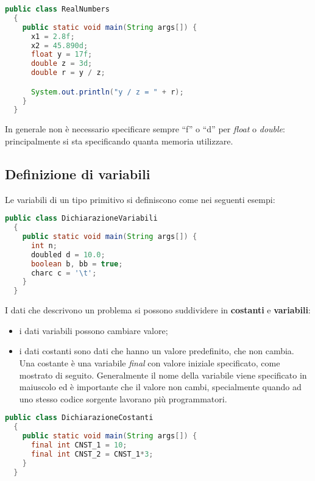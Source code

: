 \documentclass[a4paper]{extarticle}
\newcommand{\quotes}[1]{``#1''}
\begin{document}
\vspace{1em}
\noindent
\begin{lstlisting}[language=Java, caption=Operazioni reali in Java]
  public class RealNumbers
  {
    public static void main(String args[]) {
      x1 = 2.8f;
      x2 = 45.890d;
      float y = 17f;
      double z = 3d;
      double r = y / z;

      System.out.println("y / z = " + r);
    }
  }
\end{lstlisting}
\vspace{1em}

\vspace{1em}
\noindent
In generale non è necessario specificare sempre \quotes{f} o \quotes{d} per \emph{float} o \emph{double}: principalmente si sta specificando quanta memoria utilizzare.

\vspace{1em}
\subsection{Definizione di variabili}
Le variabili di un tipo primitivo si definiscono come nei seguenti esempi:

\vspace{1em}
\noindent
\begin{lstlisting}[language=Java, caption=Dichiarazione di variabili in Java]
  public class DichiarazioneVariabili
  {
    public static void main(String args[]) {
      int n;
      doubled d = 10.0;
      boolean b, bb = true;
      charc c = '\t';
    }
  }
\end{lstlisting}
\vspace{1em}

\noindent
I dati che descrivono un problema si possono suddividere in \textbf{costanti} e \textbf{variabili}:
\begin{itemize}
  \item i dati variabili possono cambiare valore;
  \item i dati costanti sono dati che hanno un valore predefinito, che non cambia. Una costante è una variabile \emph{final} con valore iniziale specificato, come mostrato di seguito. Generalmente il nome della variabile viene specificato in maiuscolo ed è importante che il valore non cambi, specialmente quando ad uno stesso codice sorgente lavorano più programmatori.
\end{itemize}

\vspace{1em}
\noindent
\begin{lstlisting}[language=Java, caption=Dichiarazione di costanti in Java]
  public class DichiarazioneCostanti
  {
    public static void main(String args[]) {
      final int CNST_1 = 10;
      final int CNST_2 = CNST_1*3;
    }
  }
\end{lstlisting}
\vspace{1em}
\end{document}
